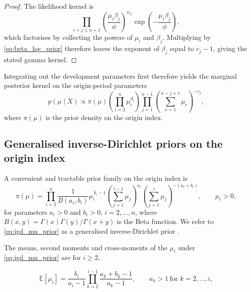 \documentclass[11pt]{article}
\newcommand{\1}{\mathbf{1}}
\begin{document}
\begin{proof}
The likelihood kernel is
\begin{equation}
\prod_{i+j\le n+1}
\left(\frac{\mu_i\beta_j}{\phi}\right)^{x_{ij}}
\exp\!\left(-\frac{\mu_i\beta_j}{\phi}\right),
\end{equation}
which factorises by collecting the powers of $\mu_i$ and $\beta_j$. Multiplying by \eqref{eq:beta_log_prior} therefore leaves the exponent of $\beta_j$ equal to $c_j-1$, giving the stated gamma kernel.
\end{proof}

Integrating out the development parameters first therefore yields the marginal posterior kernel on the origin-period parameters
\begin{equation}
p(\mu\mid X)
\propto
\pi(\mu)
\left(\prod_{i=2}^{n}\mu_i^{d_i}\right)
\prod_{j=1}^{n-1}\left(\sum_{r=1}^{n-j+1} \mu_r\right)^{-c_j},
\label{eq:mu_marginal_kernel}
\end{equation}
where $\pi(\mu)$ is the prior density on the origin index.
\subsection{Generalised inverse-Dirichlet priors on the origin index}

A convenient and tractable prior family on the origin index is
\begin{equation}
\pi(\mu)
=
\prod_{i=2}^{n}
\frac{1}{B(a_i,b_i)}
\mu_i^{\,b_i-1}
\left(\sum_{j=1}^{i-1}\mu_j\right)^{a_i}
\left(\sum_{j=1}^i\mu_j\right)^{-(a_i+b_i)},
\qquad \mu_i>0,
\label{eq:igd_mu_prior}
\end{equation}
for parameters $a_i>0$ and $b_i>0$, $i=2,\dots,n$, where $B(x,y)=\Gamma(x)\Gamma(y)/\Gamma(x+y)$ is the Beta function. We refer to \eqref{eq:igd_mu_prior} as a generalised inverse-Dirichlet prior \citep{Lingappaiah1976}. 

The means, second moments and cross-moments of the $\mu_i$ under \eqref{eq:igd_mu_prior} are for $i\ge 2$,

\begin{equation}
\mathbb{E}[\mu_i]
=
\frac{b_i}{a_i-1}
\prod_{k=2}^{i-1}
\frac{a_k+b_k-1}{a_k-1},
\qquad a_k>1 \ \text{for } k=2,\dots,i,
\label{eq:mu_mean}
\end{equation}
\end{document}
